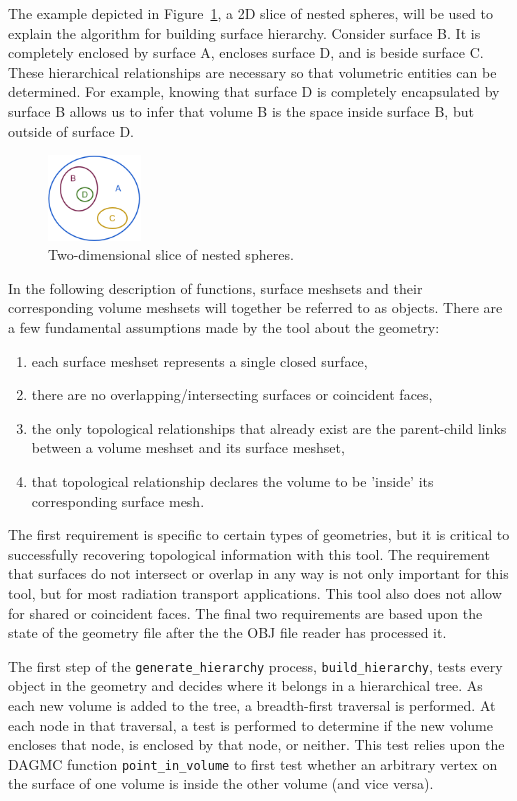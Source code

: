 \documentclass{anstrans}
\begin{document}
The example depicted in Figure~\ref{fig:spheres}, a 2D slice of nested spheres, will 
be used to explain the algorithm for building surface hierarchy. Consider surface B.
It is completely enclosed by surface A, encloses surface D, and is beside surface C. 
These hierarchical relationships are necessary so that volumetric entities can be
determined.  For example, knowing that surface D is completely encapsulated by surface B
allows us to infer that volume B is the space inside surface B, but outside of surface D.

\begin{figure}[ht]
 \centering
 \includegraphics[width=0.22\textwidth]{../figs/nested_spheres.png}
 \caption{Two-dimensional slice of nested spheres.}
 \label{fig:spheres}
\end{figure}

In the following description of functions, surface meshsets and their corresponding volume meshsets will
together be referred to as objects.  
There are a few fundamental assumptions made by the tool about the geometry:
\begin{enumerate}
\item each surface meshset represents a single closed surface,
\item there are no overlapping/intersecting surfaces or coincident faces, 
\item the only topological relationships that already exist are the parent-child links between a volume meshset and its surface meshset, 
\item that topological relationship declares the volume to be 'inside' its corresponding surface mesh.
\end{enumerate}
The first requirement is specific to certain types of geometries, but it is critical to successfully recovering 
topological information with this tool.  The requirement that surfaces do not intersect or overlap in any way is
not only important for this tool, but for most radiation transport applications.  This tool also does not allow for
shared or coincident faces.  The final two requirements are based upon the state of the geometry file after
the the OBJ file reader has processed it. 

The first step of the \texttt{generate\_hierarchy} process, \texttt{build\_hierarchy},
tests every object in the geometry and decides where
it belongs in a hierarchical tree.  As each new volume is added to the tree, a
breadth-first traversal is performed.  At each node in that traversal, a test
is performed to determine if the new volume encloses that node, is enclosed by
that node, or neither.  This test relies upon the DAGMC function \texttt{point\_in\_volume}
to first test whether an arbitrary vertex on the surface of one volume is
inside the other volume (and vice versa).
\end{document}
